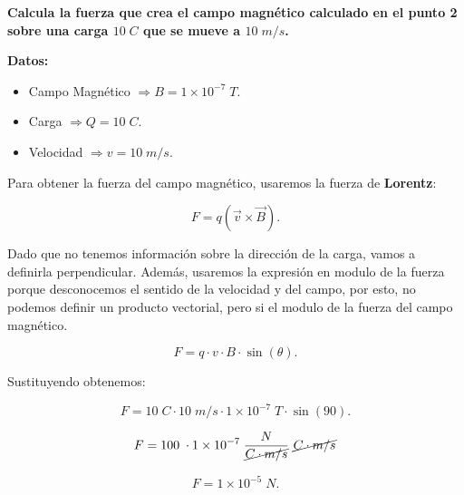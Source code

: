\documentclass[a4paper,12pt]{article} %
\begin{document}
\begin{justify}
    \textbf{Calcula la fuerza que crea el campo magnético calculado en el punto 2 sobre una carga \(10 \; C\) que se mueve a \(10 \; m/s\).}
\end{justify}

\begin{justify}
    \textbf{Datos:}
\end{justify}

\begin{itemize}
    \item Campo Magnético \( \Rightarrow B = 1 \times 10^{-7} \; T.\)
    \item Carga \( \Rightarrow Q = 10 \; C.\)
    \item Velocidad \( \Rightarrow v = 10 \; m/s. \)
\end{itemize}

\vspace{\baselineskip}

\begin{justify}
    Para obtener la fuerza del campo magnético, usaremos la fuerza de \textbf{Lorentz}:
\end{justify}

\[ F = q \left(\vec{v} \times \vec{B} \right). \]

\begin{justify}
    Dado que no tenemos información sobre la dirección de la carga, vamos a definirla perpendicular.
    Además, usaremos la expresión en modulo de la fuerza porque desconocemos el sentido de la velocidad y del campo,
    por esto, no podemos definir un producto vectorial, pero si el modulo de la fuerza del campo magnético.
\end{justify}

\[F = q \cdot v \cdot B \cdot \sin (\theta).\]

\begin{justify}
    Sustituyendo obtenemos:
\end{justify}

\[F = 10 \; C \cdot 10 \; m/s \cdot 1 \times 10^{-7} \; T \cdot \sin(90).\]

\[F = 100 \; \cdot 1 \times 10^{-7} \; \frac{N}{\cancel{C \cdot m/s}} \ \cancel{C \cdot m/s}\]

\vspace{\baselineskip}

\[\boxed{F = 1 \times 10^{-5} \; N.}\]
\end{document}
